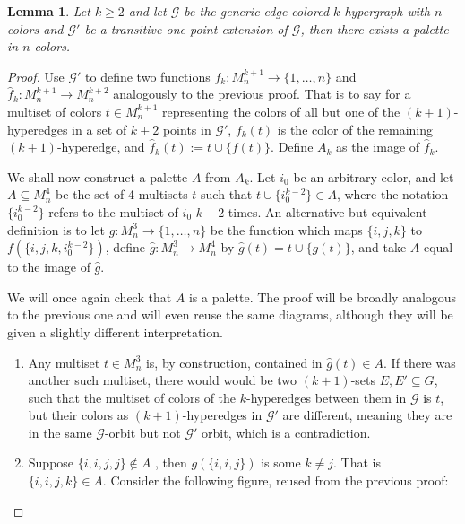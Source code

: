 \documentclass{amsart}
\newtheorem{lemma}[theorem]{Lemma}
\def\graph{\mathcal{G}}
\newcommand{\set}[1]{\{#1 \}}
\begin{document}
\begin{lemma}\label{existence of k-palettes}
    Let $k\geq 2$ and let $\graph$ be the generic edge-colored $k$-hypergraph with $n$ colors and $\graph'$ be a transitive one-point extension of $\graph$, then there exists a palette in $n$ colors.
\end{lemma}
\begin{proof}
    Use $\graph'$ to define two functions $f_k : M_n^{k+1} \rightarrow \set{1, \dots, n}$ and $\hat f_k: M_n^{k+1} \rightarrow M_n^{k+2}$ analogously to the previous proof. That is to say for a multiset of colors $t \in M_n^{k+1}$ representing the colors of all but one of the $(k+1)$-hyperedges in a set of $k+2$ points in $\graph'$, $f_k(t)$ is the color of the remaining $(k+1)$-hyperedge, and $\hat f_k(t) := t \cup \set{f(t)}$. Define $A_k$ as the image of $\hat f_k$. 
    
    We shall now construct a palette $A$ from $A_k$. Let $i_0$ be an arbitrary color, and let $A \subseteq M_n^4$ be the set of 4-multisets $t$ such that $t \cup \set{i_0^{k-2}} \in A$, where the notation $\set{i_0^{k-2}}$ refers to the multiset of $i_0$ $k-2$ times. An alternative but equivalent definition is to let $g: M_n^3 \rightarrow \set{1, \dots, n}$ be the function which maps $\{i, j, k\}$ to  $f(\set{i, j, k, i_0^{k-2}})$, define $\hat g: M_n^{3} \rightarrow  M_n^{4}$ by $\hat g(t) = t \cup \set{g(t)}$, and take $A$ equal to the image of $\hat g$.

    We will once again check that $A$ is a palette. The proof will be broadly analogous to the previous one and will even reuse the same diagrams, although they will be given a slightly different interpretation.
\begin{enumerate}
        \item Any multiset $t \in M_n^3$ is, by construction, contained in $\hat g(t) \in A$. If there was another such multiset, there would would be two $(k+1)$-sets $E, E' \subseteq G$, such that the multiset of colors of the $k$-hyperedges between them in $\graph$ is $t$, but their colors as $(k+1)$-hyperedges in $\graph'$ are different, meaning they are in the same $\graph$-orbit but not $\graph'$ orbit, which is a contradiction.

        \item Suppose $\{i, i, j, j\} \not \in A$ , then $g(\{i, i, j\})$ is some $k \neq j$. That is $\set{i,i,j,k} \in A$. Consider the following figure, reused from the previous proof:

        \begin{center}
        \begin{tikzpicture}
        


\end{tikzpicture}
\end{center}
\end{enumerate}
\end{proof}
\end{document}
